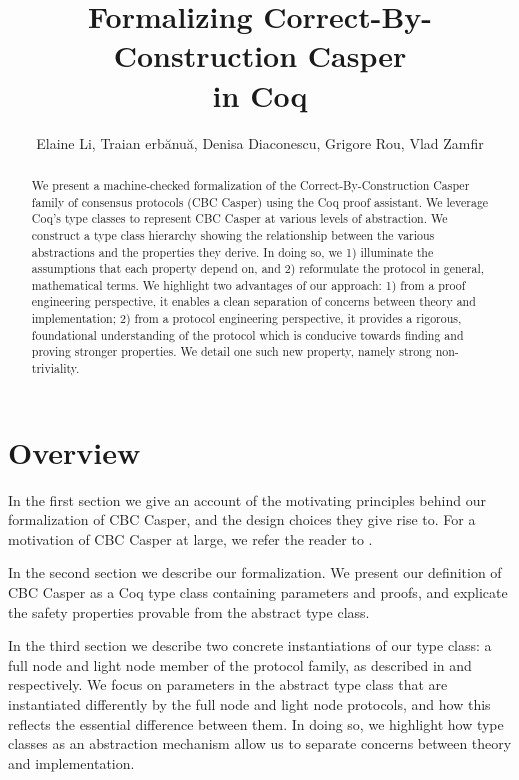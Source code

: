 \documentclass[runningheads]{llncs}
\begin{document}
	
\title{Formalizing Correct-By-Construction Casper \\ in Coq}

\author{Elaine Li, Traian erbănuă, Denisa Diaconescu, Grigore Rou, Vlad Zamfir}

\maketitle

\begin{abstract}
We present a machine-checked formalization of the Correct-By-Construction Casper family of consensus protocols (CBC Casper) using the Coq proof assistant. 
We leverage Coq's type classes to represent CBC Casper at various levels of abstraction. 
We construct a type class hierarchy showing the relationship between the various abstractions and the properties they derive. 
In doing so, we 1) illuminate the assumptions that each property depend on, and 2) reformulate the protocol in general, mathematical terms. 
We highlight two advantages of our approach: 1) from a proof engineering perspective, it enables a clean separation of concerns between theory and implementation; 2) from a protocol engineering perspective, it provides a rigorous, foundational understanding of the protocol which is conducive towards finding and proving stronger properties. We detail one such new property, namely strong non-triviality. 

\end{abstract}

\section{Overview} 
In the first section we give an account of the motivating principles behind our formalization of CBC Casper, and the design choices they give rise to. For a motivation of CBC Casper at large, we refer the reader to \cite{CBCfull}. 

In the second section we describe our formalization. We present our definition of CBC Casper as a Coq type class containing parameters and proofs, and explicate the safety properties provable from the abstract type class. 

In the third section we describe two concrete instantiations of our type class: a full node and light node member of the protocol family, as described in \cite{CBCfull} and \cite{CBClight} respectively. We focus on parameters in the abstract type class that are instantiated differently by the full node and light node protocols, and how this reflects the essential difference between them. In doing so, we highlight how type classes as an abstraction mechanism allow us to separate concerns between theory and implementation. 
\end{document}
